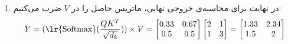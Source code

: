 \begin{ابجد}
\begin{enumerate}
    \item در نهایت برای محاسبه‌ی خروجی نهایی، ماتریس حاصل را در $V$ ضرب می‌کنیم:
          \begin{align*}
              Y = (\text{\lr{Softmax}}(\frac{QK^T}{\sqrt{d_k}})) \times V = \begin{bmatrix} 0.33 & 0.67 \\ 0.5 & 0.5 \end{bmatrix} \begin{bmatrix} 2 & 1 \\ 1 & 3 \end{bmatrix} = \begin{bmatrix} 1.33 & 2.34 \\ 1.5 & 2 \end{bmatrix}
          \end{align*}

\end{enumerate}


\end{ابجد}